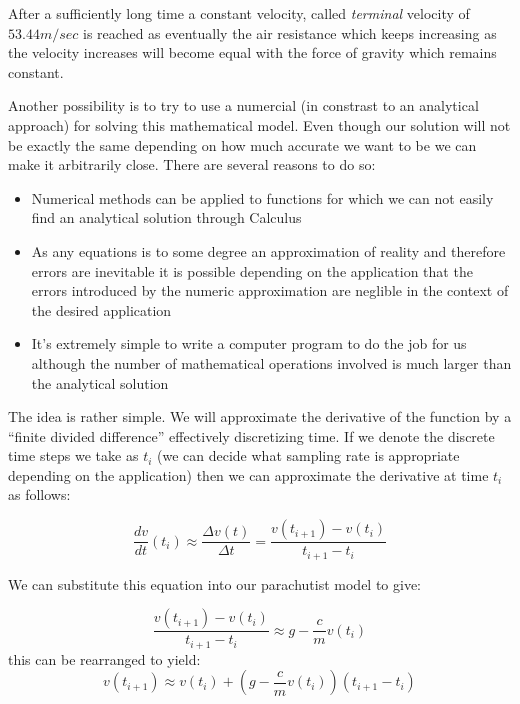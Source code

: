 \documentclass [titlepage,12pt,letter] {article}
\begin{document}
After a sufficiently long time a constant velocity, called {\it
  terminal} velocity of $53.44 m/sec$ is reached as eventually 
the air resistance which keeps increasing as the velocity increases
will become equal with the force of gravity which remains constant. 

Another possibility is to try to use a numercial (in constrast to an
analytical approach) for solving this mathematical model. Even though
our solution will not be exactly the same depending on how much
accurate we want to be we can make it arbitrarily close. There are
several reasons to do so: 
\begin{itemize} 
\item{Numerical methods can be applied to functions for which we can
    not easily find an analytical solution through Calculus} 
\item{As any equations is to some degree an approximation of reality
    and therefore errors are inevitable it is possible depending on
    the application that the errors introduced by the numeric
    approximation are neglible in the context of the desired
    application} 
\item{It's extremely simple to write a computer program to do the job 
for us although the number of mathematical operations involved is much
larger than the analytical solution} 
\end{itemize} 

The idea is rather simple. We will approximate the derivative of the
function by a ``finite divided difference'' effectively discretizing
time. If we denote the discrete time steps we take as $t_{i}$ (we can decide what 
sampling rate is appropriate depending on the application) then we can
approximate the derivative at time $t_{i}$ as follows: 

\begin{equation} 
\frac{dv}{dt}(t_{i}) \approx \frac{\Delta v(t)}{\Delta t} = \frac{v(t_{i+1}) - v(t_{i})}{t_{i+1} - t_{i}}
\end{equation} 

We can substitute this equation into our parachutist model to give: 

\begin{equation} 
\frac{v(t_{i+1}) - v(t_{i})}{t_{i+1} - t_{i}} \approx g - \frac{c}{m} v(t_{i})
\end{equation} 
\noindent 
this can be rearranged to yield: 
\begin{equation} 
v(t_{i+1}) \approx v(t_{i}) + (g - \frac{c}{m}v(t_{i}))(t_{i+1} - t_{i})
\end{equation} 
\end{document}
